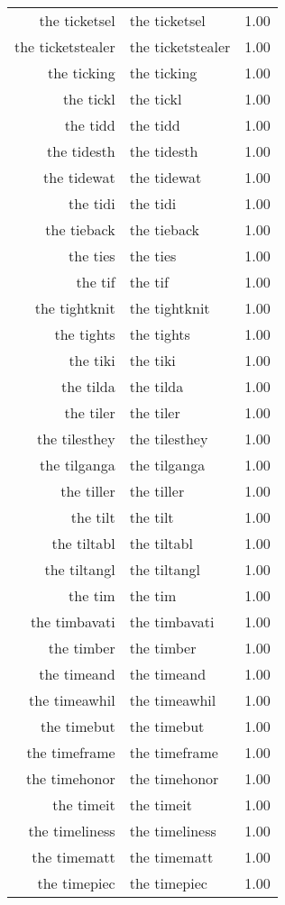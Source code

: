 \begin{table}[ht]
\begin{tabular}{rlr}
  the ticketsel & the ticketsel & 1.00 \\ 
  the ticketstealer & the ticketstealer & 1.00 \\ 
  the ticking & the ticking & 1.00 \\ 
  the tickl & the tickl & 1.00 \\ 
  the tidd & the tidd & 1.00 \\ 
  the tidesth & the tidesth & 1.00 \\ 
  the tidewat & the tidewat & 1.00 \\ 
  the tidi & the tidi & 1.00 \\ 
  the tieback & the tieback & 1.00 \\ 
  the ties & the ties & 1.00 \\ 
  the tif & the tif & 1.00 \\ 
  the tightknit & the tightknit & 1.00 \\ 
  the tights & the tights & 1.00 \\ 
  the tiki & the tiki & 1.00 \\ 
  the tilda & the tilda & 1.00 \\ 
  the tiler & the tiler & 1.00 \\ 
  the tilesthey & the tilesthey & 1.00 \\ 
  the tilganga & the tilganga & 1.00 \\ 
  the tiller & the tiller & 1.00 \\ 
  the tilt & the tilt & 1.00 \\ 
  the tiltabl & the tiltabl & 1.00 \\ 
  the tiltangl & the tiltangl & 1.00 \\ 
  the tim & the tim & 1.00 \\ 
  the timbavati & the timbavati & 1.00 \\ 
  the timber & the timber & 1.00 \\ 
  the timeand & the timeand & 1.00 \\ 
  the timeawhil & the timeawhil & 1.00 \\ 
  the timebut & the timebut & 1.00 \\ 
  the timeframe & the timeframe & 1.00 \\ 
  the timehonor & the timehonor & 1.00 \\ 
  the timeit & the timeit & 1.00 \\ 
  the timeliness & the timeliness & 1.00 \\ 
  the timematt & the timematt & 1.00 \\ 
  the timepiec & the timepiec & 1.00 \\ 

\end{tabular}
\end{table}
